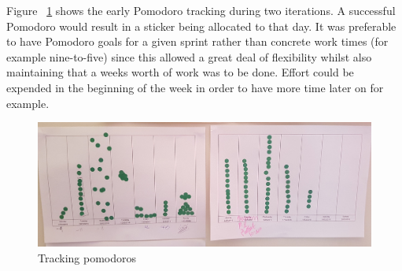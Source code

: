 Figure ~\ref{fig:pomo1} shows the early Pomodoro tracking during two iterations. A successful Pomodoro would result in a sticker being allocated to that day. It was preferable to have Pomodoro goals for a given sprint rather than concrete work times (for example nine-to-five) since this allowed a great deal of flexibility whilst also maintaining that a weeks worth of work was to be done. Effort could be expended in the beginning of the week in order to have more time later on for example.  

\begin{figure}[H]
    \centering
    \includegraphics[width=\textwidth]{images/process/pomotrack}
    \caption{Tracking pomodoros}
    \label{fig:pomo1}
\end{figure}



